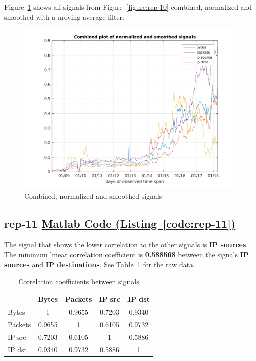 \documentclass{article}
\newcommand{\codelink}[1]{%
    \hyperref[#1]{\quad\faArrowCircleRight\enskip Matlab Code (Listing~\ref{#1})}%
}
\begin{document}
Figure~\ref{figure:rep-10-optional} shows all signals from Figure~\ref{figure:rep-10} combined, normalized
and smoothed with a moving average filter.

\begin{figure}[h]
    \centering
    \includegraphics[width=\textwidth]{../exercise-3/plots/rep_10_optional}
    \caption{\label{figure:rep-10-optional} Combined, normalized and smoothed signals}
\end{figure}

\subsection{rep-11 \codelink{code:rep-11}}

The signal that shows the lower correlation to the other signals is \textbf{IP sources}. The minimum
linear correlation coefficient is \textbf{0.588568} between the signals \textbf{IP sources} and
\textbf{IP destinations}. See Table~\ref{table:rep-11} for the raw data.

\begin{table}[H]
    \centering
    \begin{tabular}{l|c|c|c|c}
                & Bytes  & Packets& IP src    & IP dst    \\
        \hline
        Bytes   & 1      & 0.9655 & 0.7203 & 0.9340 \\
        Packets & 0.9655 & 1      & 0.6105 & 0.9732 \\
        IP src     & 0.7203 & 0.6105 & 1      & 0.5886 \\
        IP dst     & 0.9340 & 0.9732 & 0.5886 & 1      \\
    \end{tabular}
    \caption{\label{table:rep-11} Correlation coefficients between signals}
\end{table}
\end{document}
